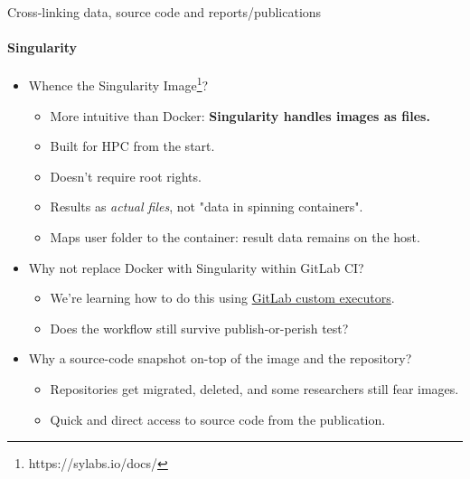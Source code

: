 \documentclass[
	aspectratio=169,%
	color={accentcolor=2d},
	logo=true,%
	colorframetitle=true,%
	]{tudabeamer}
\begin{document}
\begin{frame}{Cross-linking data, source code and reports/publications} 
    \framesubtitle{Singularity} 
        
    \vfill
    \begin{itemize}
        \item Whence the Singularity Image\footnote{https://sylabs.io/docs/}?
            \begin{itemize}
                \item More intuitive than Docker: \textbf{Singularity handles images as files.} 
                \item Built for HPC from the start. 
                \item Doesn't require root rights. 
                \item Results as \emph{actual files}, not "data in spinning containers". 
                \item Maps user folder to the container: result data remains on the host. 
            \end{itemize}
        \item Why not replace Docker with Singularity within GitLab CI? 
            \begin{itemize}
                \item We're learning how to do this using \href{https://docs.gitlab.com/runner/executors/custom.html}{GitLab custom executors}.
                \item Does the workflow still survive publish-or-perish \faGraduationCap test?
            \end{itemize}
        \item Why a source-code snapshot on-top of the image and the repository? 
            \begin{itemize}
                \item Repositories get migrated, deleted, and some researchers still fear images. 
                \item Quick and direct access to source code from the publication. 
            \end{itemize}
    \end{itemize}

\end{frame}
\end{document}
